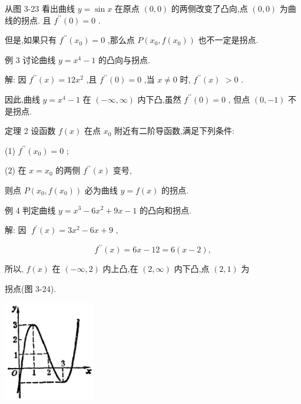 \documentclass[lang=cn,newtx,10pt,scheme=chinese]{elegantbook}
\begin{document}
从图 3-23 看出曲线 \(y = \sin x\) 在原点 \(\left( {0,0}\right)\) 的两侧改变了凸向,点 \(\left( {0,0}\right)\) 为曲线的拐点. 且 \({f}^{\prime \prime }\left( 0\right) = 0\) .

但是,如果只有 \({f}^{\prime \prime }\left( {x}_{0}\right) = 0\) ,那么点 \(P\left( {{x}_{0},f\left( {x}_{0}\right) }\right)\) 也不一定是拐点.

例 3 讨论曲线 \(y = {x}^{4} - 1\) 的凸向与拐点.

解: 因 \({f}^{\prime \prime }\left( x\right) = {12}{x}^{2}\) ,且 \({f}^{\prime \prime }\left( 0\right) = 0\) ,当 \(x \neq 0\) 时, \({f}^{\prime \prime }\left( x\right)\) \(> 0\) .

因此,曲线 \(y = {x}^{4} - 1\) 在 \(\left( {-\infty ,\infty }\right)\) 内下凸,虽然 \({f}^{\prime \prime }\left( 0\right) = 0\) , 但点 \(\left( {0, - 1}\right)\) 不是拐点.

\begin{theorem}[定理]

定理 2 设函数 \(f\left( x\right)\) 在点 \({x}_{0}\) 附近有二阶导函数,满足下列条件:

(1) \({f}^{\prime \prime }\left( {x}_{0}\right) = 0\) ;

(2) 在 \(x = {x}_{0}\) 的两侧 \({f}^{\prime \prime }\left( x\right)\) 变号,

则点 \(P\left( {{x}_{0},f\left( {x}_{0}\right) }\right)\) 必为曲线 \(y = f\left( x\right)\) 的拐点.

\end{theorem}

例 4 判定曲线 \(y = {x}^{3} - 6{x}^{2} + {9x} - 1\) 的凸向和拐点.

解: 因 \(\;{f}^{\prime }\left( x\right) = 3{x}^{2} - {6x} + 9\) ,

\[
{f}^{\prime \prime }\left( x\right) = {6x} - {12} = 6\left( {x - 2}\right) ,
\]

所以, \(f\left( x\right)\) 在 \(\left( {-\infty ,2}\right)\) 内上凸,在 \(\left( {2,\infty }\right)\) 内下凸,点 \(\left( {2,1}\right)\) 为

拐点(图 3-24).

\begin{center}
\includegraphics[max width=0.3\textwidth]{images/01912c18-5c3f-733d-b775-749ba9897a9d_170_742442.jpg}
\end{center}
\end{document}
